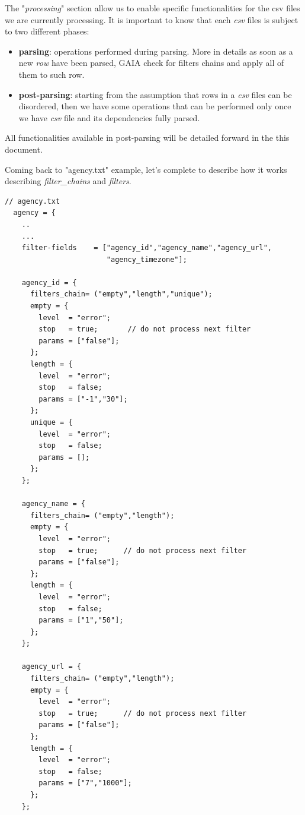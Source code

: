 \documentclass[12pt, a4paper]{book}
\begin{document}
\begin{justify}
The "\textit{processing}" section allow us to enable specific functionalities for the csv files we are currently processing.
It is important to know that each \textit{csv} files is subject to two different phases:
\begin{itemize}
\item \textbf{parsing}: operations performed during parsing. More in details as soon as a new \textit{row} have been parsed, GAIA check for filters chains and apply all of them to such row.
\item \textbf{post-parsing}: starting from the assumption that rows in a \textit{csv} files can be disordered, then we have some operations that can be performed only once we have \textit{csv} file and its dependencies fully parsed. 
\end{itemize}

All functionalities available in post-parsing will be detailed forward in the this document.

Coming back to "agency.txt" example, let's complete to describe how it works describing \textit{filter\_chains} and \textit{filters}.

\begin{small}
\begin{lstlisting}[backgroundcolor=\color{gray},frame=single]
 // agency.txt
  agency = {
    ..
    ...
    filter-fields    = ["agency_id","agency_name","agency_url",
                        "agency_timezone"];    
    
    agency_id = {
      filters_chain= ("empty","length","unique");
      empty = {
        level  = "error";
        stop   = true;       // do not process next filter
        params = ["false"];
      };
      length = {
        level  = "error";
        stop   = false;
        params = ["-1","30"];
      };
      unique = {
        level  = "error";
        stop   = false;
        params = [];
      };
    };

    agency_name = {
      filters_chain= ("empty","length");
      empty = {
        level  = "error";
        stop   = true;      // do not process next filter
        params = ["false"];
      };
      length = {
        level  = "error";
        stop   = false;
        params = ["1","50"];
      };    
    };

    agency_url = {
      filters_chain= ("empty","length");
      empty = {
        level  = "error";
        stop   = true;      // do not process next filter
        params = ["false"];
      };
      length = {
        level  = "error";
        stop   = false;
        params = ["7","1000"];
      };    
    };


\end{lstlisting}
\end{small}
\end{justify}
\end{document}
